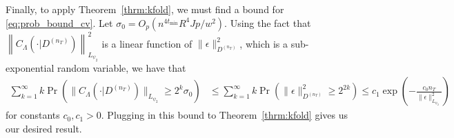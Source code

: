 \documentclass[10pt]{book}
\theoremstyle{definition}
\begin{document}
	Finally, to apply Theorem~\ref{thrm:kfold}, we must find a bound for \eqref{eq:prob_bound_cv}.
	Let $\sigma_0 = O_p(n^{4t_{\min}}R^4Jp/w^2 )$.
	Using the fact that
	$\left \| C_\Lambda(\cdot | D^{(n_T)}) \right \|_{L_{\psi_2}}^2$ is a linear function of $\|\epsilon\|_{D^{(n_T)}}^2$, which is a sub-exponential random variable, we have that
	\begin{align}
	\sum_{k = 1}^\infty k \Pr \left (
	\| C_\Lambda(\cdot | D^{(n_T)}) \|_{L_{\psi_2}}
	\ge 2^k \sigma_0
	\right )
	& \le
	\sum_{k = 1}^\infty k \Pr \left (
	\|\epsilon\|_{D^{(n_T)}}^2
	\ge 2^{2k}
	\right )
	\le
	c_1
	\exp \left (
	- \frac{c_0 n_T}{\|\epsilon\|^2_{L_{\psi_{2}}}}
	\right )
	\end{align}
	for constants $c_0, c_1 > 0$.
	Plugging in this bound to Theorem~\ref{thrm:kfold} gives us our desired result.


\end{document}
